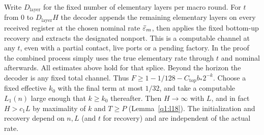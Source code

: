 Write \(D_{\mathrm{layer}}\) for the fixed number of elementary layers per macro round. For \(t\) from 0 to \(D_{\mathrm{layer}} H\) the decoder appends the remaining elementary layers on every received register at the chosen nominal rate \(\bar{\varepsilon}_{m}\), then applies the fixed bottom-up recovery and extracts the designated nonport. This is a computable channel at any \(t\), even with a partial contact, live ports or a pending factory. In the proof the combined process simply uses the true elementary rate through \(t\) and nominal afterwards. All estimates above hold for that splice. Beyond the horizon the decoder is any fixed total channel. Thus \(F\ge 1-1/128-C_{\mathrm{top}} b_{*}2^{-k}\). Choose a fixed effective \(k_{0}\) with the final term at most \(1/32\), and take a computable \(L_{1}(n)\) large enough that \(k\ge k_{0}\) thereafter. Then \(H\to\infty\) with \(L\), and in fact \(H>c_{1}L\) by maximality of \(k\) and \(T\ge P\) (Lemma~\ref{q1:l18}). The initialization and recovery depend on \(n,L\) (and \(t\) for recovery) and are independent of the actual rate.


